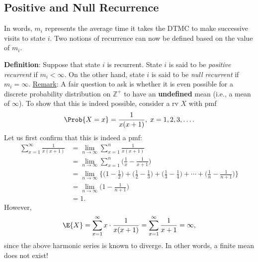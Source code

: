 \subsection*{Positive and Null Recurrence}
In words, $m_i$ represents the average time it takes the DTMC to make successive visits to state
$i$. Two notions of recurrence can now be defined based on the value of $m_i$.
\begin{Regular}
    \textbf{Definition}: Suppose that state $i$ is recurrent. State $i$ is said to be \emph{positive recurrent} if
    $ m_i<\infty $. On the other hand, state $i$ is said to be \emph{null recurrent} if $ m_i=\infty $.
    \tcblower{}
    \underline{Remark}: A fair question to ask is whether it is even possible for a discrete probability
    distribution on $ \mathbb{Z}^+ $ to have an \textbf{undefined} mean (i.e., a mean of $ \infty $). To show that this is
    indeed possible, consider a rv $X$ with pmf
    \[ \Prob{X=x}=\frac{1}{x(x+1)},\;x=1,2,3,\ldots. \]
    Let us first confirm that this is indeed a pmf:
    \begin{align*}
        \sum_{x=1}^{\infty} \frac{1}{x(x+1)}
         & =\lim_{n \rightarrow \infty} \sum_{x=1}^{n} \frac{1}{x(x+1)}                                                                                                                                       \\
         & =\lim_{n \rightarrow \infty} \sum_{x=1}^{n}\biggl(\frac{1}{x}-\frac{1}{x+1}\biggr)                                                                                                                 \\
         & =\lim_{n \rightarrow \infty}\Biggl\{\biggl(1-\frac{1}{2}\biggr)+\biggl(\frac{1}{2}-\frac{1}{3}\biggr)+\biggl(\frac{1}{3}-\frac{1}{4}\biggr)+\cdots+\biggl(\frac{1}{n}-\frac{1}{n+1}\biggr)\Biggr\} \\
         & =\lim_{n \rightarrow \infty}\biggl(1-\frac{1}{n+1}\biggr)                                                                                                                                          \\
         & =1.
    \end{align*}
    However,
    \[ \E{X}=\sum_{x=1}^{\infty} x\cdot \frac{1}{x(x+1)} =\sum_{x=1}^{\infty} \frac{1}{x+1}=\infty,  \]
    since the above harmonic series is known to diverge. In other words, a finite mean does not
    exist!
\end{Regular}
